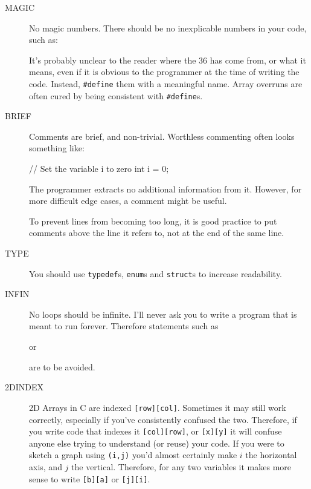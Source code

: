 \begin{description}
\item[MAGIC] No magic numbers. There should be no inexplicable numbers in your code, such
as:
\begin{codesnippet}
	if(i < 36){
\end{codesnippet}

It's probably unclear to the reader where the $36$ has come from, or what it means,
even if it is obvious to the programmer at the time of writing the code. Instead,
\verb^#define^ them with a meaningful name.
Array overruns are often cured by being consistent with \verb^#define^s.

\item[BRIEF] Comments are brief, and non-trivial. Worthless commenting often
looks something like:
\begin{codesnippet}
// Set the variable i to zero
int i = 0;
\end{codesnippet}
The programmer extracts no additional information from it. However, for more
difficult edge cases, a comment might be useful.
\begin{codesnippet}
// Have we reached the end of the list ?
if(t1->h == NULL){ 
\end{codesnippet}

\noindent To prevent lines from becoming too long, it is good practice to put comments above
the line it refers to, not at the end of the same line.

\item[TYPE] You should use \verb^typedef^s, \verb^enum^s and \verb^struct^s to
increase readability. 

\item[INFIN] No loops should be infinite. I'll never ask you to write a program that is meant to run forever. Therefore statements such as
\begin{codesnippet}
while(1){
\end{codesnippet}
or
\begin{codesnippet}
for(;;;){
\end{codesnippet}
are to be avoided.

\item[2DINDEX] 2D Arrays in C are indexed \verb^[row][col]^.  Sometimes
it may still work correctly, especially if you've consistently confused
the two.  Therefore, if you write code that indexes it \verb^[col][row]^,
or \verb^[x][y]^ it will confuse anyone else trying to understand (or
reuse) your code. If you were to sketch a graph using \verb^(i,j)^ you'd
almost certainly make $i$ the horizontal axis, and $j$ the vertical.
Therefore, for any two variables it makes more sense to write \verb^[b][a]^
or \verb^[j][i]^.

\end{description}
